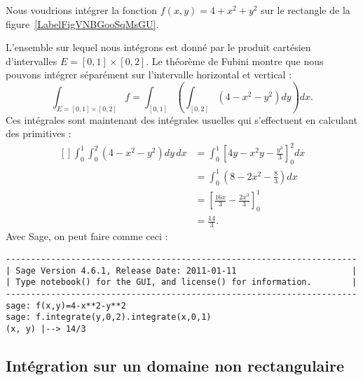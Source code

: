 \begin{example}
	Nous voudrions intégrer la fonction \( f(x,y)=4+x^2+y^2\) sur le rectangle de la figure~\ref{LabelFigVNBGooSqMsGU}. %
	\newcommand{\CaptionFigVNBGooSqMsGU}{Intégration sur un rectangle}
	

	L'ensemble sur lequel nous intégrons est donné par le produit cartésien d'intervalles \( E=[0,1]\times[0,2]\). Le théorème de Fubini montre que nous pouvons intégrer séparément sur l'intervalle horizontal et vertical :
	\begin{equation}
		\int_{E=[0,1]\times[0,2]}f=\int_{[0,1]}\left( \int_{[0,2]}(4-x^2-y^2)dy \right)dx.
	\end{equation}
	Ces intégrales sont maintenant des intégrales usuelles qui s'effectuent en calculant des primitives :
	\begin{equation}
		\begin{aligned}[]
			\int_0^1\int_0^2(4-x^2-y^2)dy\,dx & =\int_0^1\left[ 4y-x^2y-\frac{ y^3 }{ 3 } \right]_0^2dx  \\
			                                  & =\int_0^1(8-2x^2-\frac{ 8 }{ 3 })dx                      \\
			                                  & =\left[ \frac{ 16x }{ 3 }-\frac{ 2x^3 }{ 3 } \right]_0^1 \\
			                                  & =\frac{ 14 }{ 3 }.
		\end{aligned}
	\end{equation}
	Avec Sage, on peut faire comme ceci :

	\begin{verbatim}
----------------------------------------------------------------------
| Sage Version 4.6.1, Release Date: 2011-01-11                       |
| Type notebook() for the GUI, and license() for information.        |
----------------------------------------------------------------------
sage: f(x,y)=4-x**2-y**2
sage: f.integrate(y,0,2).integrate(x,0,1)
(x, y) |--> 14/3

    \end{verbatim}

\end{example}

\subsection{Intégration sur un domaine non rectangulaire}
\label{PgRapIntMultFubiniTri}

